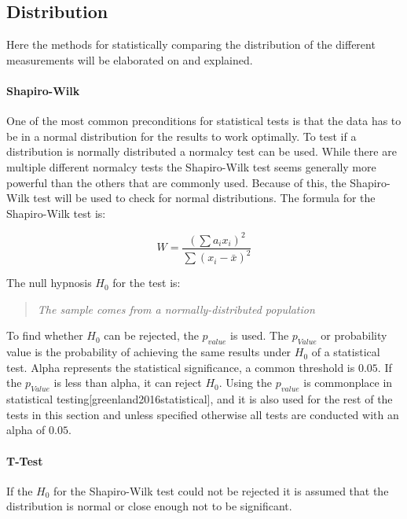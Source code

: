 \subsection{Distribution}
Here the methods for statistically comparing the distribution of the different measurements will be elaborated on and explained.

\paragraph{Shapiro-Wilk}
One of the most common preconditions for statistical tests is that the data has to be in a normal distribution for the results to work optimally. To test if a distribution is normally distributed a normalcy test can be used. While there are multiple different normalcy tests the Shapiro-Wilk test seems generally more powerful than the others that are commonly used\cite{razali2011power}. Because of this, the Shapiro-Wilk test will be used to check for normal distributions. The formula for the Shapiro-Wilk test is:

\begin{equation}
    W=\frac{( \sum{a_i x_i} )^2}{\sum{(x_i - \bar{x})^2}}
\end{equation}

The null hypnosis $H_0$ for the test is:

\begin{quotation}
    \textit{The sample comes from a normally-distributed population}
\end{quotation}

To find whether $H_0$ can be rejected, the $p_{value}$ is used. The $p_{Value}$ or probability value is the probability of achieving the same results under $H_0$ of a statistical test. Alpha represents the statistical significance, a common threshold is $0.05$. If the $p_{Value}$ is less than alpha, it can reject $H_0$. Using the $p_{value}$ is commonplace in statistical testing[greenland2016statistical], and it is also used for the rest of the tests in this section and unless specified otherwise all tests are conducted with an alpha of $0.05$.

\paragraph{T-Test}

If the $H_0$ for the Shapiro-Wilk test could not be rejected it is assumed that the distribution is normal or close enough not to be significant.

